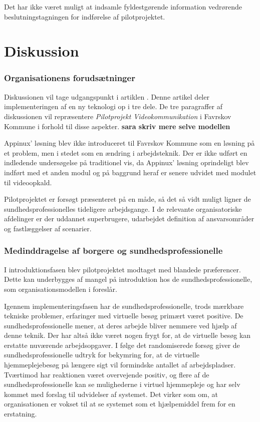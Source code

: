 Det har ikke været muligt at indsamle fyldestgørende information vedrørende beslutningstagningen for indførelse af pilotprojektet.

  
\section{Diskussion}
\subsubsection{Organisationens forudsætninger}
Diskussionen vil tage udgangspunkt i artiklen . Denne artikel deler implementeringen af en ny teknologi op i tre dele. De tre paragraffer af diskussionen vil repræsentere \textit{Pilotprojekt Videokommunikation} i Favrskov Kommune i forhold til disse aspekter.
\textbf{sara skriv mere selve modellen}

Appinux’ løsning blev ikke introduceret til Favrskov Kommune som en løsning på et problem, men i stedet som en ændring i arbejdsteknik. Der er ikke udført en indledende undersøgelse på traditionel vis, da Appinux' løsning oprindeligt blev indført med et anden modul og på baggrund heraf er senere udvidet med modulet til videoopkald.

Pilotprojektet er forsøgt præsenteret på en måde, så det så vidt muligt ligner de sundhedsprofessionelles tideligere arbejdsgange. I de relevante organisatoriske afdelinger er der uddannet superbrugere, udarbejdet definition af ansvarsområder og fastlæggelser af scenarier. 

\subsubsection{Medinddragelse af borgere og sundhedsprofessionelle}
I introduktionsfasen blev pilotprojektet modtaget med blandede præferencer. Dette kan underbygges af mangel på introduktion hos de sundhedsprofessionelle, som organisationsmodellen i  foreslår. 

Igennem implementeringsfasen har de sundhedsprofessionelle, trods mærkbare tekniske problemer, erfaringer med virtuelle besøg primært været positive. De sundhedsprofessionelle mener, at deres arbejde bliver nemmere ved hjælp af denne teknik. Der har altså ikke været nogen frygt for, at de virtuelle besøg kan erstatte nuværende arbejdsopgaver. I følge det randomiserede forsøg  giver de sundhedsprofessionelle udtryk for bekymring for, at de virtuelle hjemmeplejebesøg på længere sigt vil formindske antallet af arbejdspladser. Tværtimod har reaktionen været overvejende positiv, og flere af de sundhedsprofessionelle kan se mulighederne i virtuel hjemmepleje og har selv kommet med forslag til udvidelser af systemet. Det virker som om, at organisationen er vokset til at se systemet som et hjælpemiddel frem for en erstatning.

